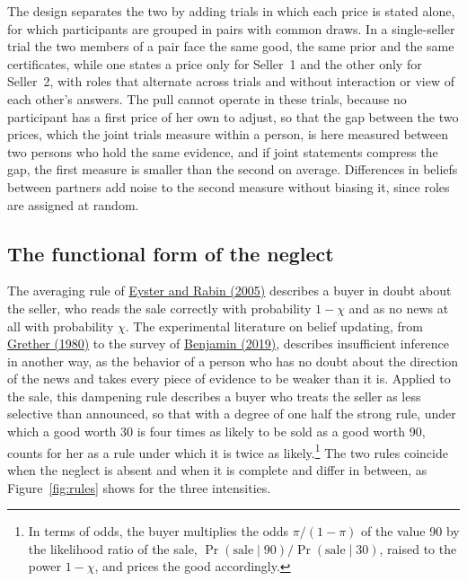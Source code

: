 \documentclass[11pt,a4paper]{article}
\newcommand{\cy}[2]{\hyperlink{cite.#1}{\textcolor{citecolor}{#2}}}
\newcommand{\sale}{\mathrm{sale}}
\begin{document}
The design separates the two by adding trials in which each price is stated alone, for which participants are grouped in pairs with common draws. In a single-seller trial the two members of a pair face the same good, the same prior and the same certificates, while one states a price only for Seller~1 and the other only for Seller~2, with roles that alternate across trials and without interaction or view of each other's answers. The pull cannot operate in these trials, because no participant has a first price of her own to adjust, so that the gap between the two prices, which the joint trials measure within a person, is here measured between two persons who hold the same evidence, and if joint statements compress the gap, the first measure is smaller than the second on average. Differences in beliefs between partners add noise to the second measure without biasing it, since roles are assigned at random.

\subsection{The functional form of the neglect}\label{sec:form}

The averaging rule of \cy{eysterrabin}{Eyster and Rabin (2005)} describes a buyer in doubt about the seller, who reads the sale correctly with probability $1-\chi$ and as no news at all with probability $\chi$. The experimental literature on belief updating, from \cy{grether}{Grether (1980)} to the survey of \cy{benjamin}{Benjamin (2019)}, describes insufficient inference in another way, as the behavior of a person who has no doubt about the direction of the news and takes every piece of evidence to be weaker than it is. Applied to the sale, this dampening rule describes a buyer who treats the seller as less selective than announced, so that with a degree of one half the strong rule, under which a good worth 30 is four times as likely to be sold as a good worth 90, counts for her as a rule under which it is twice as likely.\footnote{In terms of odds, the buyer multiplies the odds $\pi/(1-\pi)$ of the value 90 by the likelihood ratio of the sale, $\Pr(\sale\mid 90)/\Pr(\sale\mid 30)$, raised to the power $1-\chi$, and prices the good accordingly.} The two rules coincide when the neglect is absent and when it is complete and differ in between, as Figure~\ref{fig:rules} shows for the three intensities.
\end{document}
